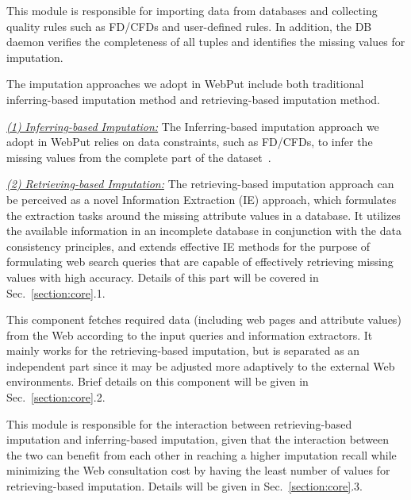 \documentclass[sigconf]{acmart}
\begin{document}
 This module is responsible for importing data from databases and collecting quality rules such as FD/CFDs and user-defined rules. In addition, the DB daemon verifies the completeness of all tuples and identifies the missing values for imputation.


 The imputation approaches we adopt in WebPut include both traditional inferring-based imputation method and retrieving-based imputation method.

\noindent\underline{\it (1) Inferring-based Imputation:}
The Inferring-based imputation approach we adopt in WebPut relies on data constraints, such as FD/CFDs, to infer the missing values from the complete part of the dataset~\cite{kolahi2009approximating, fan2008conditional}.


\noindent\underline{\it (2) Retrieving-based Imputation:}
The retrieving-based imputation approach can be perceived as a novel Information Extraction (IE) approach, which formulates the extraction tasks around the missing attribute values in a database. It utilizes the available information in an incomplete database in conjunction with the data consistency principles, and extends effective IE methods for the purpose of formulating web search queries that are capable of effectively retrieving missing values with high accuracy. Details of this part will be covered in Sec.~\ref{section:core}.1.

This component fetches required data (including web pages and attribute values) from the Web according to the input queries and information extractors. It mainly works for the retrieving-based imputation, but is separated as an independent part since it may be adjusted more adaptively to the external Web environments. Brief details on this component will be given in Sec.~\ref{section:core}.2.


 This module is responsible for the interaction between retrieving-based imputation and inferring-based imputation, given that the interaction between the two can benefit from each other in reaching a higher imputation recall while minimizing the Web consultation cost by having the least number of values for retrieving-based imputation. Details will be given in Sec.~\ref{section:core}.3.
%
%
%
\end{document}
